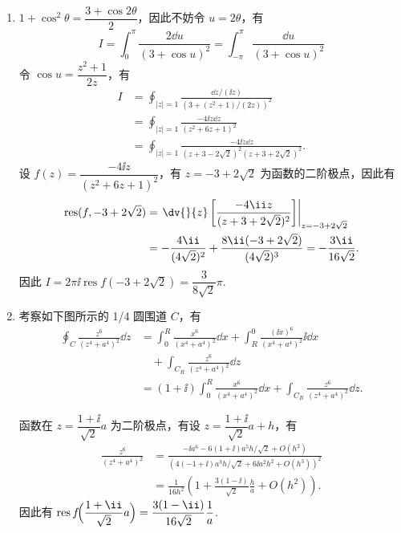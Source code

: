 \begin{question}
\begin{solution}
\begin{enumerate}
  \item \(1+\cos^2\theta=\dfrac{3+\cos2\theta}{2}\)，因此不妨令 \(u=2\theta\)，有
\[
I=\int_0^{\pi}\frac{2\dd{u}}{(3+\cos u)^2}=\int_{-\pi}^{\pi}\frac{\dd{u}}{(3+\cos u)^2}
\]
令 \(\cos u=\dfrac{z^2+1}{2z}\)，有
\[
\begin{aligned}
I
&=\oint_{|z|=1}\frac{\dd{z}/(\ii z)}
{\left(3+(z^2+1)/(2z)\right)^2}\\
&=\oint_{|z|=1}\frac{-4\ii z\dd{z}}{(z^2+6z+1)^2}\\
&=\oint_{|z|=1}
\frac{-4\ii z\dd{z}}
{(z+3-2\sqrt2)^2(z+3+2\sqrt2)^2}.
\end{aligned}
\]
设 \(f(z)=\dfrac{-4\ii z}{(z^2+6z+1)^2}\)，有 \(z=-3+2\sqrt2\) 为函数的二阶极点，因此有
\[
\begin{aligned}
\operatorname{res}(f,-3+2\sqrt2)
&=\left.\dv{}{z}\left[\frac{-4\ii z}{(z+3+2\sqrt2)^2}\right]
\right|_{z=-3+2\sqrt2}\\
&=-\frac{4\ii}{(4\sqrt2)^2}
+\frac{8\ii(-3+2\sqrt2)}{(4\sqrt2)^3}
=-\frac{3\ii}{16\sqrt2}.
\end{aligned}
\]
因此 \(I=2\pi\ii\operatorname{res}f(-3+2\sqrt2)=\dfrac{3}{8\sqrt2}\pi\).

  \item 考察如下图所示的 1/4 圆围道 \(C\)，有
\[
\begin{aligned}
\oint_C\frac{z^6}{(z^4+a^4)^2}\dd{z}
&=\int_0^R\frac{x^6}{(x^4+a^4)^2}\dd{x}
+\int_R^0\frac{(\ii x)^6}{(x^4+a^4)^2}\ii\dd{x}\\
&\quad+\int_{C_R}\frac{z^6}{(z^4+a^4)^2}\dd{z}\\
&=(1+\ii)\int_0^R\frac{x^6}{(x^4+a^4)^2}\dd{x}
+\int_{C_R}\frac{z^6}{(z^4+a^4)^2}\dd{z}.
\end{aligned}
\]

\begin{center}
\end{center}

函数在 \(z=\dfrac{1+\ii}{\sqrt2}a\) 为二阶极点，有设 \(z=\dfrac{1+\ii}{\sqrt2}a+h\)，有
\[
\begin{aligned}
\frac{z^6}{(z^4+a^4)^2}
&=\frac{-\ii a^6-6(1+\ii)a^5h/\sqrt2+O(h^2)}
{\left(4(-1+\ii)a^3h/\sqrt2+6\ii a^2h^2+O(h^3)\right)^2}\\
&=\frac1{16h^2}
\left(1+\frac{3(1-\ii)}{\sqrt2}\frac{h}{a}+O(h^2)\right).
\end{aligned}
\]
因此有 \(\operatorname{res}f\!\Bigl(\dfrac{1+\ii}{\sqrt2}a\Bigr)=\dfrac{3(1-\ii)}{16\sqrt2}\dfrac1a\).


\end{enumerate}
\end{solution}
\end{question}
